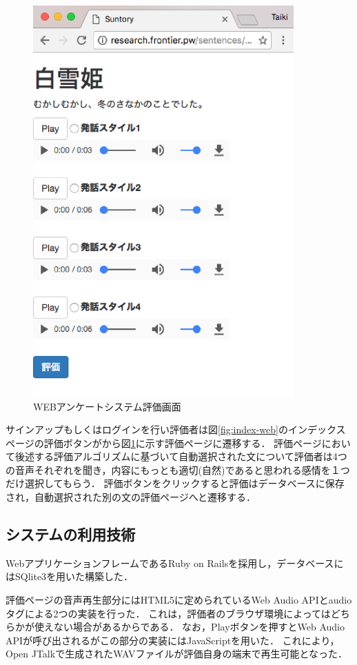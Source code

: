 \begin{figure}[ht]
  \begin{center}
    \includegraphics[clip,width=10.0cm]{fig/web.eps}
    \caption{WEBアンケートシステム評価画面}
    \label{fig:web}
  \end{center}
\end{figure}
サインアップもしくはログインを行い評価者は図\ref{fig:index-web}のインデックスページの評価ボタンがから図\ref{fig:web}に示す評価ページに遷移する．
評価ページにおいて後述する評価アルゴリズムに基づいて自動選択された文について評価者は4つの音声それぞれを聞き，内容にもっとも適切(自然)であると思われる感情を１つだけ選択してもらう．
評価ボタンをクリックすると評価はデータベースに保存され，自動選択された別の文の評価ページへと遷移する．

\subsection{システムの利用技術}
WebアプリケーションフレームであるRuby on Rails\cite{rails}を採用し，データベースにはSQlite3\cite{sqlite}を用いた構築した．

評価ページの音声再生部分にはHTML5に定められているWeb Audio APIとaudioタグによる2つの実装を行った．
これは，評価者のブラウザ環境によってはどちらかが使えない場合があるからである．
なお，Playボタンを押すとWeb Audio APIが呼び出されるがこの部分の実装にはJavaScriptを用いた．
これにより，Open JTalkで生成されたWAVファイルが評価自身の端末で再生可能となった．

